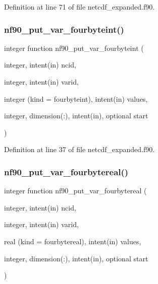 Definition at line 71 of file netcdf\+\_\+expanded.\+f90.

\mbox{\label{netcdf__expanded_8f90_a1a5eac8109e488b5e0d5a18931978861}} 
\subsubsection{\texorpdfstring{nf90\+\_\+put\+\_\+var\+\_\+fourbyteint()}{nf90\_put\_var\_fourbyteint()}}
{\footnotesize\ttfamily integer function nf90\+\_\+put\+\_\+var\+\_\+fourbyteint (\begin{DoxyParamCaption}\item[{integer, intent(in)}]{ncid,  }\item[{integer, intent(in)}]{varid,  }\item[{integer (kind = fourbyteint), intent(in)}]{values,  }\item[{integer, dimension(\+:), intent(in), optional}]{start }\end{DoxyParamCaption})}



Definition at line 37 of file netcdf\+\_\+expanded.\+f90.

\mbox{\label{netcdf__expanded_8f90_a6acbd7d06b475d2a9cf6dae39ee1ef74}} 
\subsubsection{\texorpdfstring{nf90\+\_\+put\+\_\+var\+\_\+fourbytereal()}{nf90\_put\_var\_fourbytereal()}}
{\footnotesize\ttfamily integer function nf90\+\_\+put\+\_\+var\+\_\+fourbytereal (\begin{DoxyParamCaption}\item[{integer, intent(in)}]{ncid,  }\item[{integer, intent(in)}]{varid,  }\item[{real (kind = fourbytereal), intent(in)}]{values,  }\item[{integer, dimension(\+:), intent(in), optional}]{start }\end{DoxyParamCaption})}



